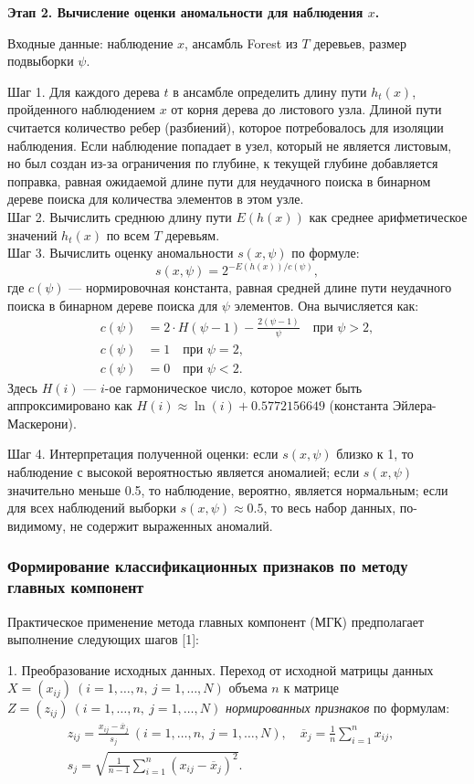 \documentclass[14pt,a4paper]{extarticle}
\begin{document}
\textbf{Этап 2. Вычисление оценки аномальности для наблюдения $x$.}

Входные данные: наблюдение $x$, ансамбль Forest из $T$ деревьев, размер подвыборки $\psi$.

Шаг 1. Для каждого дерева $t$ в ансамбле определить длину пути $h_{t}(x)$, пройденного наблюдением $x$ от корня дерева до листового узла. Длиной пути считается количество ребер (разбиений), которое потребовалось для изоляции наблюдения. Если наблюдение попадает в узел, который не является листовым, но был создан из-за ограничения по глубине, к текущей глубине добавляется поправка, равная ожидаемой длине пути для неудачного поиска в бинарном дереве поиска для количества элементов в этом узле.\\
Шаг 2. Вычислить среднюю длину пути $E(h(x))$ как среднее арифметическое значений $h_{t}(x)$ по всем $T$ деревьям.\\
Шаг 3. Вычислить оценку аномальности $s(x, \psi)$ по формуле:
\[
s(x, \psi) = 2^{ -E(h(x)) / c(\psi) },
\]
где $c(\psi)$ --- нормировочная константа, равная средней длине пути неудачного поиска в бинарном дереве поиска для $\psi$ элементов. Она вычисляется как:
\begin{align*}
c(\psi) &= 2 \cdot H(\psi - 1) - \frac{2(\psi - 1)}{\psi} \quad \text{при } \psi > 2,\\
c(\psi) &= 1 \quad \text{при } \psi = 2,\\
c(\psi) &= 0 \quad \text{при } \psi < 2.
\end{align*}
Здесь $H(i)$ --- $i$-ое гармоническое число, которое может быть аппроксимировано как $H(i) \approx \ln(i) + 0.5772156649$ (константа Эйлера-Маскерони).

Шаг 4. Интерпретация полученной оценки: если $s(x, \psi)$ близко к 1, то наблюдение с высокой вероятностью является аномалией; если $s(x, \psi)$ значительно меньше 0.5, то наблюдение, вероятно, является нормальным; если для всех наблюдений выборки $s(x, \psi) \approx 0.5$, то весь набор данных, по-видимому, не содержит выраженных аномалий.

\subsubsection{Формирование классификационных признаков по методу главных компонент}

Практическое применение метода главных компонент (МГК) предполагает выполнение следующих шагов [1]:

1. Преобразование исходных данных. Переход от исходной матрицы данных $X = (x_{ij})\ (i=1,\ldots,n,\ j=1,\ldots,N)$ объема $n$ к матрице $Z = (z_{ij})\ (i=1,\ldots,n,\ j=1,\ldots,N)$ \textit{нормированных признаков} по формулам:
\begin{equation}
\begin{gathered}
z_{ij} = \frac{x_{ij} - \overline{x}_{j}}{s_{j}}\ (i=1,\ldots,n,\ j=1,\ldots,N),\quad
\overline{x}_{j} = \frac{1}{n}\sum_{i=1}^{n} x_{ij},\quad \\
s_{j} = \sqrt{\frac{1}{n-1}\sum_{i=1}^{n} (x_{ij} - \overline{x}_{j})^{2}}.
\end{gathered}
\end{equation}
\end{document}
